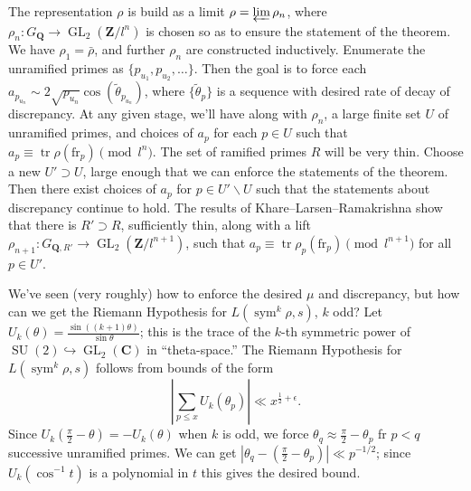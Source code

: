 \documentclass{article}
\DeclareMathOperator{\GL}{GL}
\DeclareMathOperator{\SU}{SU}
\DeclareMathOperator{\sym}{sym}
\DeclareMathOperator{\tr}{tr}
\newcommand{\bC}{\mathbf{C}}
\newcommand{\bQ}{\mathbf{Q}}
\newcommand{\bZ}{\mathbf{Z}}
\newcommand{\frob}{\mathrm{fr}}
\begin{document}
The representation $\rho$ is build as a limit $\rho = \varprojlim \rho_n$, 
where $\rho_n\colon G_\bQ \to \GL_2(\bZ/l^n)$ is chosen so as to ensure the 
statement of the theorem. We have $\rho_1 = \bar\rho$, and further $\rho_n$ 
are constructed inductively. Enumerate the unramified primes as 
$\{p_{u_1},p_{u_2},\dots\}$. Then the goal is to force each 
$a_{p_{u_n}} \sim 2\sqrt{p_{u_n}} \cos(\widetilde \theta_{p_{u_n}})$, where 
$\{\widetilde\theta_p\}$ is a sequence with desired rate of decay of 
discrepancy. At any given stage, we'll have along with $\rho_n$, a large finite 
set $U$ of unramified primes, and choices of $a_p$ for each $p\in U$ such that 
$a_p\equiv \tr\rho(\frob_p)\pmod{l^n}$. The set of ramified primes $R$ will be 
very thin. Choose a new $U'\supset U$, large enough that we can enforce the 
statements of the theorem. Then there exist choices of $a_p$ for 
$p\in U'\smallsetminus U$ such that the statements about discrepancy continue 
to hold. The results of Khare--Larsen--Ramakrishna show that there is 
$R'\supset R$, sufficiently thin, along with a lift 
$\rho_{n+1}\colon G_{\bQ,R'}\to \GL_2(\bZ/l^{n+1})$, such that 
$a_p\equiv\tr\rho_p(\frob_p)\pmod{l^{n+1}}$ for all $p\in U'$. 

We've seen (very roughly) how to enforce the desired $\mu$ and discrepancy, but 
how can we get the Riemann Hypothesis for $L(\sym^k \rho,s)$, $k$ odd? Let 
$U_k(\theta) = \frac{\sin((k+1)\theta)}{\sin\theta}$; this is the trace of the 
$k$-th symmetric power of $\SU(2)\hookrightarrow \GL_2(\bC)$ in 
``theta-space.'' The Riemann Hypothesis for $L(\sym^k \rho,s)$ follows from 
bounds of the form 
\[
	\left| \sum_{p\leqslant x} U_k(\theta_p)\right| \ll x^{\frac 1 2+\epsilon} .
\]
Since $U_k\left(\frac \pi 2 - \theta\right) = - U_k(\theta)$ when $k$ is odd, 
we force $\theta_q \approx \frac \pi 2 - \theta_p$ fr $p<q$ successive 
unramified primes. We can get 
$\left|\theta_q - \left( \frac \pi 2 - \theta_p\right)\right| \ll p^{-1/2}$; 
since $U_k(\cos^{-1} t)$ is a polynomial in $t$ this gives the desired bound. 
\end{document}
